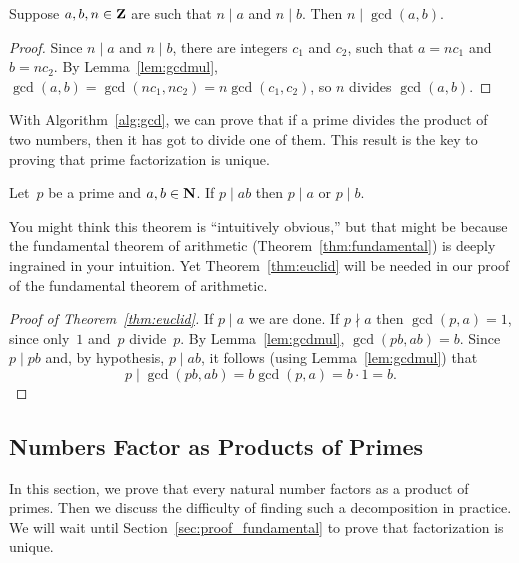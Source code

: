 \begin{lemma}\label{lem:gcd2}
  Suppose $a,b,n\in\mathbf{Z}$ are such that $n\mid a$ and $n\mid b$.  Then
  $n\mid \gcd(a,b)$.
\end{lemma}
\begin{proof}
Since $n\mid a$ and $n\mid b$, there are integers
$c_1$ and $c_2$, such that $a=n c_1$ and $b=n c_2$.
By Lemma~\ref{lem:gcdmul},
$\gcd(a,b) = \gcd(n c_1, nc_2) = n\gcd(c_1, c_2)$,
so $n$ divides $\gcd(a,b)$.
\end{proof}


With Algorithm~\ref{alg:gcd}, we can prove that if a prime divides the
product of two numbers, then it has got to divide one of them.  This
result is the key to proving that prime factorization
is unique.
\begin{theorem}[Euclid]\label{thm:euclid}%
%
Let~$p$ be a prime and $a, b\in \mathbf{N}$.
If $p\mid ab$ then $p\mid a$ or $p\mid b$.
\end{theorem}
You might think this theorem is ``intuitively obvious,'' but that
might be because the fundamental theorem of
arithmetic
(Theorem~\ref{thm:fundamental}) is deeply ingrained in your intuition.
Yet Theorem~\ref{thm:euclid} will be needed in our proof of the
fundamental theorem of arithmetic.

\begin{proof}[Proof of Theorem~\ref{thm:euclid}]
  If $p\mid a$ we are done.  If $p\nmid a$ then $\gcd(p,a)=1$, since
  only~$1$ and~$p$ divide~$p$.  By Lemma~\ref{lem:gcdmul},
  $\gcd(pb,ab) = b$. Since $p\mid pb$ and, by hypothesis, $p\mid ab$,
  it follows (using Lemma~\ref{lem:gcdmul}) that
  $$p\mid \gcd(pb,ab) = b\gcd(p,a) = b\cdot 1 = b.$$
\end{proof}

\subsection{Numbers Factor as Products of Primes}\label{sec:numfact}
In this section, we prove that every natural number factors as a
product of primes.
Then we discuss the difficulty of finding such a decomposition
in practice.  We will wait until Section~\ref{sec:proof_fundamental}
to prove that factorization is unique.

